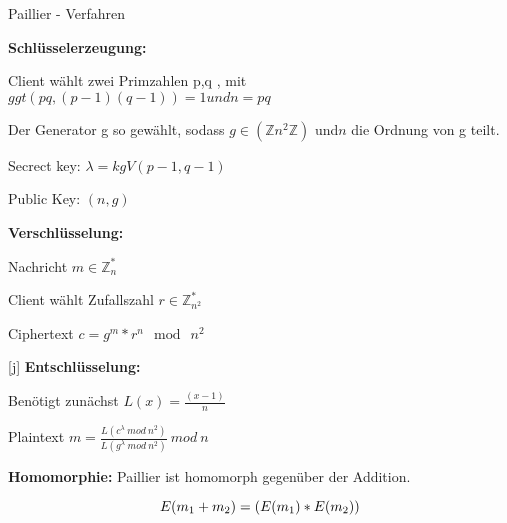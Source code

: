 \documentclass{beamer}
\begin{document}
\begin{frame}{Paillier - Verfahren}

	\textbf{Schlüsselerzeugung:}\\
	
	\begin{arrowlist}
	\item Client wählt zwei Primzahlen p,q , mit $ ggt(pq, (p-1)(q-1))= 1 und n =pq $  
	\item Der Generator g so gewählt, sodass $ g \in (\mathbb{Z} n^{2} \mathbb{Z}) $ und$ n $ die Ordnung von g teilt.	
	\item Secrect key: $ \lambda = kgV(p-1, q-1) $
	\item Public Key: $(n,g)$	
	\end{arrowlist}
	
	

\end{frame}

\begin{frame}
		\textbf{Verschlüsselung:}
		\begin{arrowlist}
			\item Nachricht  $ m \in \mathbb{Z}_{n}^{*} $
			\item Client wählt Zufallszahl $ r  \in \mathbb{Z}_{n^{2}}^{*} $ 
			\item Ciphertext $ c = g^{m}*r^{n} \mod\ n^{2} $
		\end{arrowlist}
		
[j]
		\textbf{Entschlüsselung:}
		\begin{arrowlist}
			\item Benötigt zunächst $ L(x)= \frac{(x-1)}{n} $
			\item Plaintext $ m = \frac{L(c^{\lambda} \ mod \ n^{2}) }{L(g^{\lambda} \ mod \ n^{2})} \ mod \ n $
		\end{arrowlist}


		\textbf{Homomorphie:}
		Paillier ist homomorph gegenüber der Addition.
		
		$$ E(m \textsubscript{1} + m \textsubscript{2}) = (E(m \textsubscript{1}) * E(m \textsubscript{2}))$$
\end{frame}
\end{document}
